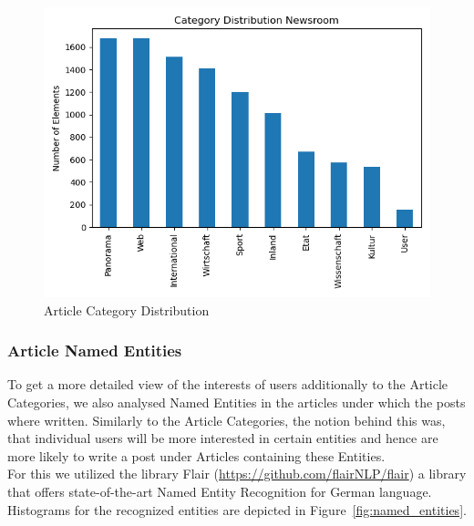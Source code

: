 \documentclass[acmsmall]{acmart}
\begin{document}
\begin{figure}[H]
\includegraphics[width=.5\linewidth]{assets/Category_Distribution_Newsroom.png}
\caption{Article Category Distribution}
\label{fig:article_categories}
\end{figure}


\subsubsection{Article Named Entities}
To get a more detailed view of the interests of users additionally to the Article Categories, we also analysed Named Entities in the articles under which the posts where written. Similarly to the Article Categories, the notion behind this was, that individual users will be more interested in certain entities and hence are more likely to write a post under Articles containing these Entities. \\
For this we utilized the library Flair (\url{https://github.com/flairNLP/flair}) a library that offers state-of-the-art Named Entity Recognition for German language. Histograms for the recognized entities are depicted in Figure~\ref{fig:named_entities}.
\end{document}
